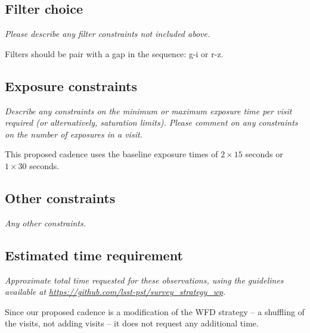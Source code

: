 \documentclass[11pt]{article}
\begin{document}
\subsection{Filter choice}
\begin{footnotesize}
{\it Please describe any filter constraints not included above.}
\end{footnotesize}

Filters should be pair with a gap in the sequence: g-i or r-z.                                                       
\subsection{Exposure constraints}
\begin{footnotesize}
{\it Describe any constraints on the minimum or maximum exposure time per visit required (or alternatively, saturation limits). Please comment on any constraints on the number of exposures in a visit.}
\end{footnotesize}

This proposed cadence uses the baseline exposure times of $2\times15$ seconds or $1\times30$ seconds.

\subsection{Other constraints}
\begin{footnotesize}
{\it Any other constraints.}
\end{footnotesize}

\subsection{Estimated time requirement}
\begin{footnotesize}
{\it Approximate total time requested for these observations, using the guidelines available at \url{https://github.com/lsst-pst/survey_strategy_wp}.}
\end{footnotesize}

Since our proposed cadence is a modification of the WFD strategy -- a shuffling of the visits, not adding visits -- it does not request any additional time.

\vspace{.3in}
\end{document}

